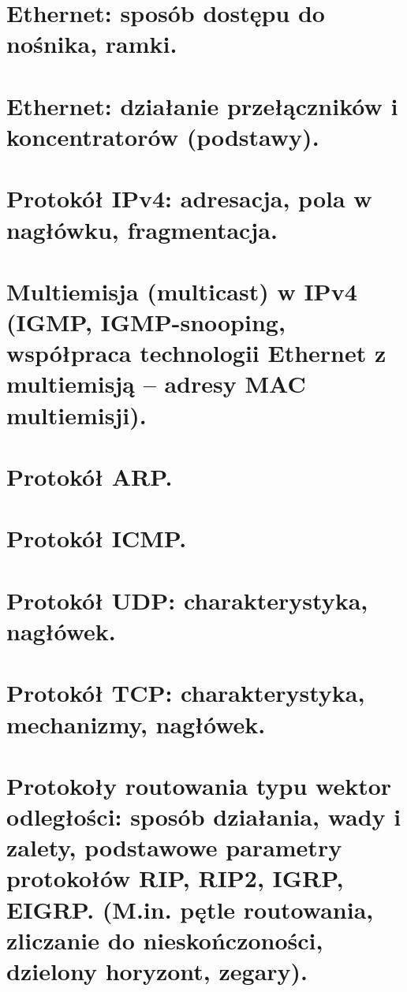 \documentclass[a4paper]{article}
\begin{document}
    \section{Ethernet: sposób dostępu do nośnika, ramki.}
    

    \section{Ethernet: działanie przełączników i koncentratorów (podstawy).}
    

    \section{Protokół IPv4: adresacja, pola w nagłówku, fragmentacja.}
    

    \section{Multiemisja (multicast) w IPv4 (IGMP, IGMP-snooping, współpraca technologii Ethernet z
    multiemisją – adresy MAC multiemisji).}
    

    \section{Protokół ARP.}
    

    \section{Protokół ICMP.}
    

    \section{Protokół UDP: charakterystyka, nagłówek.}
    

    \section{Protokół TCP: charakterystyka, mechanizmy, nagłówek.}
    

    \section{Protokoły routowania typu wektor odległości: sposób działania, wady i zalety,
    podstawowe parametry protokołów RIP, RIP2, IGRP, EIGRP. (M.in. pętle routowania,
    zliczanie do nieskończoności, dzielony horyzont, zegary).}
    
\end{document}
